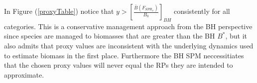 

%
In Figure (\ref{proxyTable}) notice that $y>\left[\frac{\bar B(F_{SPR_x})}{B_0}\right]_{BH}$ %
consistently for all categories. This is a conservative management approach 
from the BH perspective since species are managed to biomasses %
that are greater than the BH $B^*$, but it also admits that proxy values 
are inconsistent with the underlying dynamics used to estimate biomass in 
the first place. Furthermore the BH SPM neccessitiates that the chosen proxy 
values will never equal the RPs they are intended to approximate.

%
%



%
%

